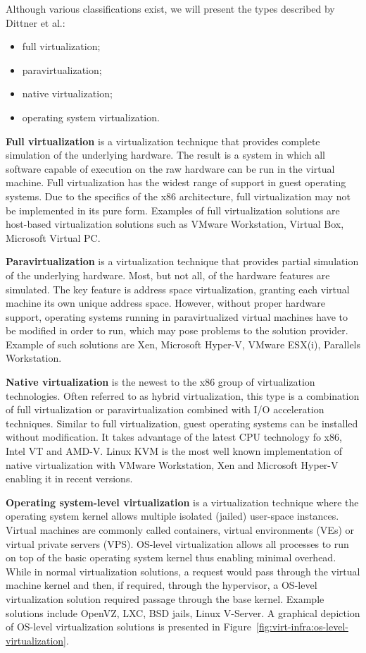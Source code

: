 Although various classifications exist, we will present the types described by
Dittner et al.:

\begin{itemize}
  \item full virtualization;
  \item paravirtualization;
  \item native virtualization;
  \item operating system virtualization.
\end{itemize}

\textbf{Full virtualization} is a virtualization technique that provides
complete simulation of the underlying hardware. The result is a system in
which all software capable of execution on the raw hardware can be run in the
virtual machine. Full virtualization has the widest range of support in guest
operating systems. Due to the specifics of the x86 architecture, full
virtualization may not be implemented in its pure form. Examples of
full virtualization solutions are host-based virtualization solutions such as
VMware Workstation, Virtual Box, Microsoft Virtual PC.

\textbf{Paravirtualization} is a virtualization technique that provides
partial simulation of the underlying hardware. Most, but not all, of the
hardware features are simulated. The key feature is address space
virtualization, granting each virtual machine its own unique address space.
However, without proper hardware support, operating systems running in
paravirtualized virtual machines have to be modified in order to run, which
may pose problems to the solution provider. Example of such solutions are Xen,
Microsoft Hyper-V, VMware ESX(i), Parallels Workstation.

\textbf{Native virtualization} is the newest to the x86 group of
virtualization technologies. Often referred to as hybrid virtualization, this
type is a combination of full virtualization or paravirtualization combined
with I/O acceleration techniques. Similar to full virtualization, guest
operating systems can be installed without modification. It takes advantage of
the latest CPU technology fo x86, Intel VT and AMD-V. Linux KVM is the most
well known implementation of native virtualization with VMware Workstation,
Xen and Microsoft Hyper-V enabling it in recent versions.

\textbf{Operating system-level virtualization} is a virtualization technique
where the operating system kernel allows multiple isolated (jailed) user-space
instances. Virtual machines are commonly called containers, virtual
environments (VEs) or virtual private servers (VPS). OS-level virtualization
allows all processes to run on top of the basic operating system kernel thus
enabling minimal overhead. While in normal virtualization solutions, a request
would pass through the virtual machine kernel and then, if required, through
the hypervisor, a OS-level virtualization solution required passage through
the base kernel. Example solutions include OpenVZ, LXC, BSD jails, Linux
V-Server. A graphical depiction of OS-level virtualization solutions is
presented in Figure~\ref{fig:virt-infra:os-level-virtualization}.

